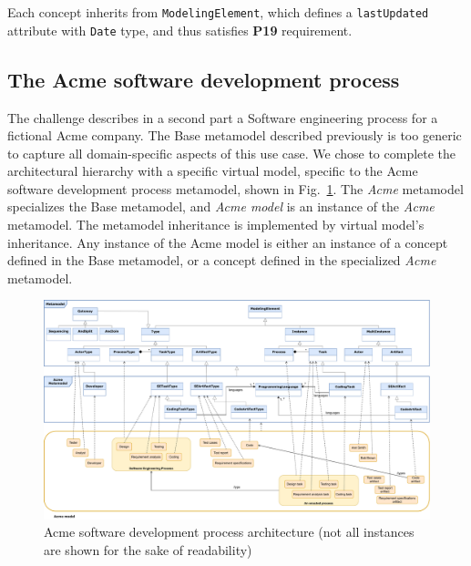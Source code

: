 Each concept inherits from \texttt{ModelingElement}, which defines a
\texttt{lastUpdated} attribute with \texttt{Date} type, and thus satisfies
\textbf{P19} requirement.

\subsection{The Acme software development process}
\label{sec:AcmeSoftwareDevelopmentProcess}

The challenge describes in a second part a Software engineering process for a
fictional Acme company. The Base metamodel described previously is too generic
to capture all domain-specific aspects of this use case. We chose to complete
the architectural hierarchy with a specific virtual model, specific to the Acme
software development process metamodel, shown in
Fig.~\ref{fig:AcmeFullArchitecture}.  The \textit{Acme} metamodel specializes
the Base metamodel, and \textit{Acme model} is an instance of the \textit{Acme}
metamodel. The metamodel inheritance is implemented by virtual model's
inheritance. Any instance of the Acme model is either an instance of a concept
defined in the Base metamodel, or a concept defined in the specialized
\textit{Acme} metamodel.


\begin{figure}
 \centering
     \includegraphics[width=1.0 \textwidth]{Figures/AcmeFullArchitecture-1.5.pdf}
     \caption{Acme software development process architecture (not all instances are shown for the sake of readability)}
    \label{fig:AcmeFullArchitecture}
\end{figure}


